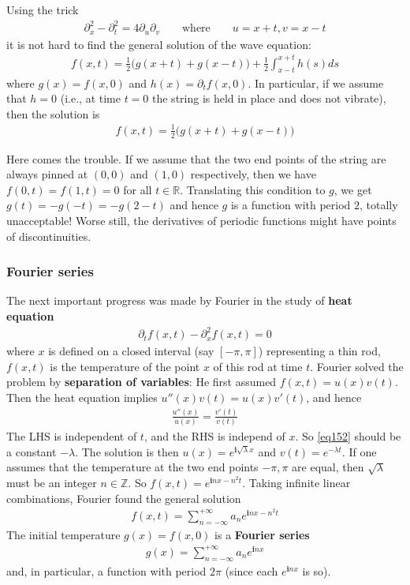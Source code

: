 \documentclass[12pt,b5paper,notitlepage]{article}
\theoremstyle{definition}
\theoremstyle{plain}
\newcommand{\im}{\mathbf{i}}
\newcommand{\Zbb}{\mathbb Z}
\newcommand{\Rbb}{\mathbb R}
\numberwithin{equation}{section}
\begin{document}
Using the trick
\begin{align*}
\partial_x^2-\partial_t^2=4\partial_u\partial_v\qquad\text{where}\qquad u=x+t,v=x-t
\end{align*}
it is not hard to find the general solution of the wave equation:
\begin{align}
f(x,t)=\frac 12\big(g(x+t)+g(x-t) \big)+\frac 12\int_{x-t}^{x+t}h(s)ds
\end{align}
where $g(x)=f(x,0)$ and $h(x)=\partial_t f(x,0)$. In particular, if we assume that $h=0$ (i.e., at time $t=0$ the string is held in place and does not vibrate), then the solution is
\begin{align}
f(x,t)=\frac 12\big(g(x+t)+g(x-t) \big)
\end{align}

Here comes the trouble. If we assume that the two end points of the string are always pinned at $(0,0)$ and $(1,0)$ respectively, then we have $f(0,t)=f(1,t)=0$ for all $t\in\Rbb$. Translating this condition to $g$, we get $g(t)=-g(-t)=-g(2-t)$ and hence $g$ is a function with period $2$, totally unacceptable! Worse still, the derivatives of periodic functions might have points of discontinuities.

\subsubsection{Fourier series}


The next important progress was made by Fourier in the study of \textbf{heat equation}
\begin{align}
\partial_t f(x,t)-\partial_x^2 f(x,t)=0
\end{align}
where $x$ is defined on a closed interval (say $[-\pi,\pi]$) representing a thin rod, $f(x,t)$ is the temperature   of the point $x$ of this rod at time $t$. Fourier solved the problem by \textbf{separation of variables}: He first assumed $f(x,t)=u(x)v(t)$. Then the heat equation implies $u''(x)v(t)=u(x)v'(t)$, and hence
\begin{align}
\frac{u''(x)}{u(x)}=\frac{v'(t)}{v(t)}  \label{eq152}
\end{align}
The LHS is independent of $t$, and the RHS is independ of $x$. So \eqref{eq152} should be a constant $-\lambda$. The solution is then $u(x)=e^{\im\sqrt\lambda x}$ and $v(t)=e^{-\lambda t}$. If one assumes that the temperature at the two end points $-\pi,\pi$ are equal, then $\sqrt\lambda$ must be an integer $n\in\Zbb$. So $f(x,t)=e^{\im nx-n^2t}$. Taking infinite linear combinations, Fourier found the general solution
\begin{align}
f(x,t)=\sum_{n=-\infty}^{+\infty} a_n e^{\im nx-n^2t}  \label{eq153}
\end{align}
The initial temperature $g(x)=f(x,0)$ is a \textbf{Fourier series}
\begin{align}
g(x)=\sum_{n=-\infty}^{+\infty} a_n e^{\im nx} \label{eq156}
\end{align}
and, in particular, a function with period $2\pi$ (since each $e^{\im nx}$ is so). 
\end{document}
